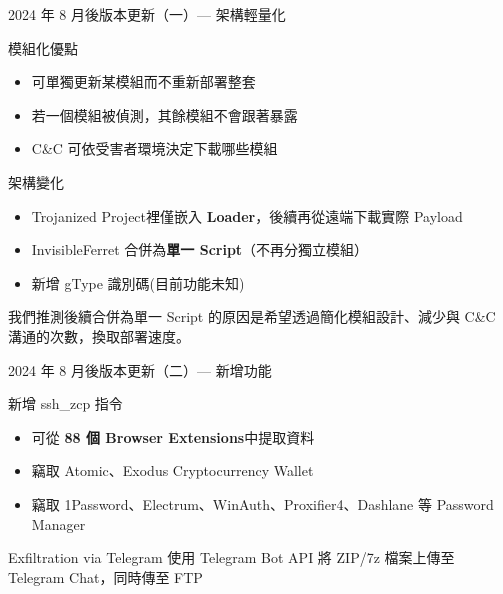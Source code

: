 \documentclass{beamer}
\begin{document}
\begin{frame}{2024 年 8 月後版本更新（一）— 架構輕量化}
  \begin{block}{模組化優點}
    \begin{itemize}
      \item 可單獨更新某模組而不重新部署整套
      \item 若一個模組被偵測，其餘模組不會跟著暴露
      \item C\&C 可依受害者環境決定下載哪些模組
    \end{itemize}
  \end{block}
  \begin{block}{架構變化}
    \begin{itemize}
      \item Trojanized Project裡僅嵌入 \textbf{Loader}，後續再從遠端下載實際 Payload
      \item InvisibleFerret 合併為\textbf{單一 Script}（不再分獨立模組）
      \item 新增 gType 識別碼(目前功能未知)
    \end{itemize}
  \end{block}
  我們推測後續合併為單一 Script 的原因是希望透過簡化模組設計、減少與 C\&C 溝通的次數，換取部署速度。

\end{frame}

\begin{frame}{2024 年 8 月後版本更新（二）— 新增功能}
  \begin{block}{新增 ssh\_zcp 指令}
    \begin{itemize}
      \item 可從 \textbf{88 個 Browser Extensions}中提取資料
      \item 竊取 Atomic、Exodus Cryptocurrency Wallet
      \item 竊取 1Password、Electrum、WinAuth、Proxifier4、Dashlane 等 Password Manager
    \end{itemize}
  \end{block}

  \begin{block}{Exfiltration via Telegram}
    使用 Telegram Bot API 將 ZIP/7z 檔案上傳至 Telegram Chat，同時傳至 FTP
  \end{block}
\end{frame}
\end{document}
